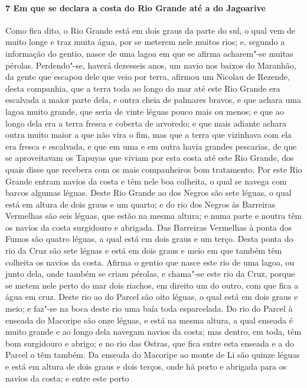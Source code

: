 \begin{linenumbers}
\paragraph{7 Em que se declara a costa do Rio Grande até a do Jagoarive} \quad
Como fica dito, o Rio Grande está em dois graus da parte do sul, o qual vem de muito longe
e traz muita água, por se meterem nele muitos rios; e, segundo a informação do gentio,
nasce de uma lagoa em que se afirma acharem"-se muitas pérolas. Perdendo"-se, haverá
dezesseis anos, um navio nos baixos do Maranhão, da gente que escapou dele que veio por
terra, afirmou um Nicolau de Rezende, desta companhia, que a terra toda ao longo do mar
até este Rio Grande era escalvada a maior parte dela, e outra cheia de palmares bravos, e
que achara uma lagoa muito grande, que seria de vinte léguas pouco mais ou menos; e que ao
longo dela era a terra fresca e coberta de arvoredo; e que mais adiante achara outra muito
maior a que não vira o fim, mas que a terra que vizinhava com ela era fresca e escalvada,
e que em uma e em outra havia grandes pescarias, de que se aproveitavam os Tapuyas que
viviam por esta costa até este Rio Grande, dos quais disse que recebera com os mais
companheiros bom tratamento. Por este Rio Grande entram navios da costa e têm nele boa
colheita, o qual se navega com barcos algumas léguas. Deste Rio Grande ao dos Negros são
sete léguas, o qual está em altura de dois graus e um quarto; e do rio dos Negros às
Barreiras Vermelhas são seis léguas, que estão na mesma altura; e numa parte e noutra têm
os navios da costa surgidouro e abrigada. Das Barreiras Vermelhas à ponta dos Fumos são
quatro léguas, a qual está em dois graus e um terço. Desta ponta do rio da Cruz são sete
léguas e está em dois graus e meio em que também têm colheita os navios da costa. Afirma o
gentio que nasce este rio de uma lagoa, ou junto dela, onde também se criam pérolas, e
chama"-se este rio da Cruz, porque se metem nele perto do mar dois riachos, em direito um
do outro, com que fica a água em cruz. Deste rio ao do Parcel são oito léguas, o qual está
em dois graus e meio; e faz"-se na boca deste rio uma baía toda esparcelada. Do rio do
Parcel à enseada do Macoripe são onze léguas, e está na mesma altura, a qual enseada é
muito grande e ao longo dela navegam navios da costa; mas dentro, em toda, têm bom
surgidouro e abrigo; e no rio das Ostras, que fica entre esta enseada e a do Parcel o têm
também. Da enseada do Macoripe ao monte de Li são quinze léguas e está em altura de dois
graus e dois terços, onde há porto e abrigada para os navios da costa; e entre este porto

\end{linenumbers}
